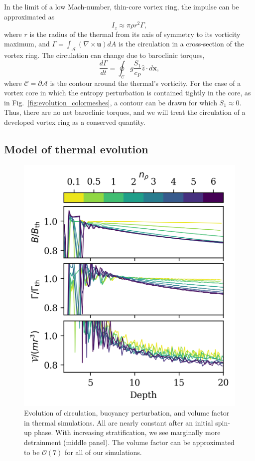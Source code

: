 \documentclass[twocolumn, amsmath, amsfonts, amssymb, trackchanges]{aastex62}
\newcommand{\grad}{\ensuremath{\nabla}}
\begin{document}
In the limit of a low Mach-number, thin-core vortex ring, the impulse can be approximated as
\begin{equation}
I_z \approx \pi \rho r^2 \Gamma,
\label{eqn:impulse_approx}
\end{equation}
where $r$ is the radius of the thermal from its axis of symmetry to its vorticity maximum, and $\Gamma = \int_{\mathcal{A}} (\grad\times\bm{u})dA$ is the circulation in a cross-section of the vortex ring.
The circulation can change due to baroclinic torques,
\begin{equation}
\frac{d\Gamma}{dt} = \oint_{\mathcal{C}} g \frac{S_1}{c_P}\hat{z} \cdot d\bm{x},
\label{eqn:circulation}
\end{equation}
where $\mathcal{C}=\partial \mathcal{A}$ is the contour around the thermal's vorticity.
For the case of a vortex core in which the entropy perturbation is contained tightly in the core, as in Fig.~\ref{fig:evolution_colormeshes}, a contour can be drawn for which $S_1\approx0$.
Thus, there are no net baroclinic torques, and we will treat the circulation of a developed vortex ring as a conserved quantity.


\subsection{Model of thermal evolution}
\begin{figure}[t!]
    \includegraphics[width=\columnwidth]{constants.png}
    \caption{
	Evolution of circulation, buoyancy perturbation, and volume factor in thermal simulations.
	All are nearly constant after an initial spin-up phase.
	With increasing stratification, we see marginally more detrainment (middle panel).
	The volume factor can be approximated to be $\mathcal{O}(7)$ for all of our simulations.
    \label{fig:constants} }
\end{figure}
\end{document}
